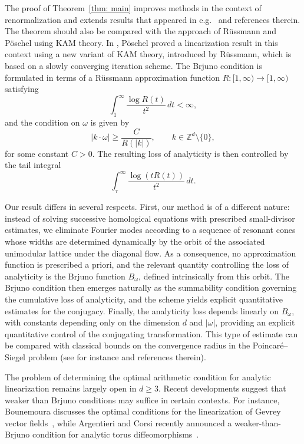\documentclass[12pt,reqno,a4paper]{amsart}%
\numberwithin{equation}{section}
\newcommand{\Zz}{{\mathbb{Z}}}
\begin{document}
The proof of Theorem~\ref{thm: main} improves methods in the context of renormalization and extends results that appeared in e.g.~\cite{jld5,jld10,DiasGaivao2019} and references therein.
The theorem should also be compared with the  approach of R\"ussmann and P\"oschel using KAM theory. In \cite{Poschel2010KAMR}, P\"oschel proved a linearization result in this context using a new variant of KAM theory,  introduced by R\"ussmann, which is based on a slowly converging iteration scheme.  The Brjuno condition  is formulated in terms of a R\"ussmann approximation function $R\colon[1,\infty)\to[1,\infty)$
satisfying
$$
\int_1^\infty \frac{\log R(t)}{t^2}\,dt<\infty,
$$
and the condition on  $\omega$ is given by
$$
|k\cdot\omega|\ge \frac{C}{R(|k|)},
\qquad 
k\in\Zz^d\setminus\{0\},
$$
for some constant $C>0$.
The resulting loss of analyticity is then controlled by the tail integral
$$
\int_\tau^\infty \frac{\log (t R(t))}{t^2}\,dt.
$$

Our result differs in several respects.  First, our method is of a different nature: instead of solving successive homological equations with prescribed small-divisor estimates, we eliminate Fourier modes according to a sequence of resonant cones whose widths are determined dynamically by the orbit of the associated unimodular lattice under the diagonal flow.
As a consequence, no approximation function is prescribed a priori, and the relevant quantity controlling the loss of analyticity is the Brjuno function $B_\omega$, defined intrinsically from this orbit. The Brjuno condition then emerges naturally as the summability condition governing the cumulative loss of analyticity, and the scheme yields explicit quantitative estimates for the conjugacy.
Finally, the analyticity loss depends linearly on $B_\omega$, with constants depending only on the dimension $d$ and $|\omega|$,  providing an explicit quantitative control of the conjugating transformation. This type of estimate can be compared with classical bounds on the convergence radius in the Poincaré--Siegel problem (see for instance \cite{GM10} and references therein).


The problem of determining the optimal arithmetic condition for analytic linearization remains largely open in $d\ge3$. 
Recent developments suggest that weaker than Brjuno conditions may suffice in certain contexts. 
For instance,  Bounemoura discusses the optimal conditions for the linearization of Gevrey vector fields~\cite{Bounemoura2022}, while Argentieri and Corsi recently announced a weaker-than-Brjuno condition for analytic torus diffeomorphisms~\cite{ArgentieriCorsi2024}.  
\end{document}
